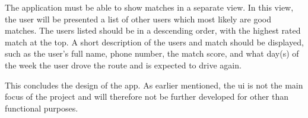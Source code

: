 The application must be able to show matches in a separate view.
In this view, the user will be presented a list of other users which most likely are good matches. 
The users listed should be in a descending order, with the highest rated match at the top.
A short description of the users and match should be displayed, such as the user's full name, phone number, the match score, and what day(s) of the week the user drove the route and is expected to drive again.

This concludes the design of the app.
As earlier mentioned, the \gls{ui} is not the main focus of the project and will therefore not be further developed for other than functional purposes.

